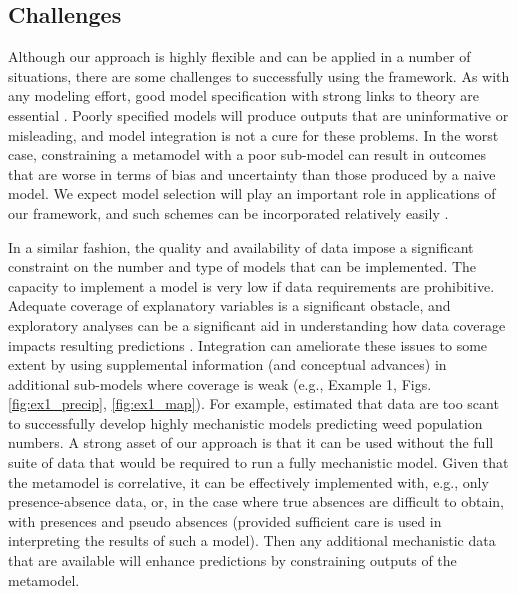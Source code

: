 \subsection*{Challenges} 
Although our approach is highly flexible and can be applied in a number of situations, there are some challenges to successfully using the framework.
As with any modeling effort, good model specification with strong links to theory are essential \citep{Austin2007}.
Poorly specified models will produce outputs that are uninformative or misleading, and model integration is not a cure for these problems.
In the worst case, constraining a metamodel with a poor sub-model can result in outcomes that are worse in terms of bias and uncertainty than those produced by a naive model.
We expect model selection will play an important role in applications of our framework, and such schemes can be incorporated relatively easily \citep{Madigan1995, Wasserman2000, Tenan2014}.

In a similar fashion, the quality and availability of data impose a significant constraint on the number and type of models that can be implemented.
The capacity to implement a model is very low if data requirements are prohibitive. 
Adequate coverage of explanatory variables is a significant obstacle, and exploratory analyses can be a significant aid in understanding how data coverage impacts resulting predictions \citep{Mckenney2002}.
Integration can ameliorate these issues to some extent by using supplemental information (and conceptual advances) in additional sub-models where coverage is weak (e.g., Example 1, Figs. \ref{fig:ex1_precip}, \ref{fig:ex1_map}).
For example, \citet{Freckleton2009} estimated that data are too scant to successfully develop highly mechanistic models predicting weed population numbers. 
A strong asset of our approach is that it can be used without the full suite of data that would be required to run a fully mechanistic model. 
Given that the metamodel is correlative, it can be effectively implemented with, e.g., only presence-absence data, or, in the case where true absences are difficult to obtain, with presences and pseudo absences (provided sufficient care is used in interpreting the results of such a model).
Then any additional mechanistic data that are available will enhance predictions by constraining outputs of the metamodel. 

